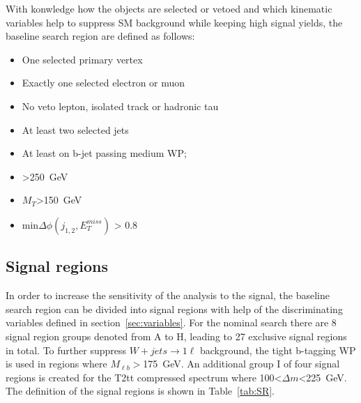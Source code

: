 With konwledge how the objects are selected or vetoed and  which kinematic variables help to suppress SM background while keeping high signal yields, the baseline search region are defined as follows:

\begin{itemize}
\item One selected primary vertex
\item Exactly one selected electron or muon
\item No veto lepton, isolated track or hadronic tau
\item At least two selected jets
\item At least on b-jet passing medium WP; 
\item \MET>250~GeV
\item $M_{T}$>150~GeV
\item min$\Delta \phi (j_{1,2}, E_{T}^{miss})$ > 0.8
\end{itemize}


\subsection{Signal regions~\label{sec:sr}}

In order to increase the sensitivity of the analysis to the signal, the baseline search region can be divided into signal regions with help of the discriminating variables defined in section~\ref{sec:variables}. For the nominal search there are 8 signal region groups denoted from A to H, leading to 27 exclusive signal regions in total. To further suppress $W+jets \to 1\ell$ background, the tight b-tagging WP is used in regions where $M_{\ell b}>$175~GeV.  An additional group I of four signal regions is created for the T2tt compressed spectrum where 100<$\Delta m$<225~GeV. The definition of the signal regions is shown in Table~\ref{tab:SR}.


